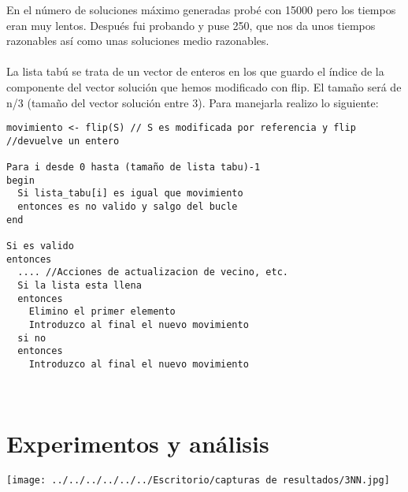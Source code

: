 En el número de soluciones máximo generadas probé con 15000 pero los tiempos eran muy lentos. Después fui probando y puse 250, que nos da unos tiempos razonables así como unas soluciones medio razonables.
\\
\\
La lista tabú se trata de un vector de enteros en los que guardo el índice de la componente del vector solución que hemos modificado con flip. El tamaño será de n/3 (tamaño del vector solución entre 3). Para manejarla realizo lo siguiente:
\begin{lstlisting}
movimiento <- flip(S) // S es modificada por referencia y flip 			//devuelve un entero

Para i desde 0 hasta (tamaño de lista tabu)-1
begin
  Si lista_tabu[i] es igual que movimiento
  entonces es no valido y salgo del bucle
end

Si es valido
entonces
  .... //Acciones de actualizacion de vecino, etc.
  Si la lista esta llena
  entonces
    Elimino el primer elemento
    Introduzco al final el nuevo movimiento
  si no
  entonces
    Introduzco al final el nuevo movimiento
  
 
\end{lstlisting}

\section{Experimentos y análisis}
\texttt{[image: ../../../../../../Escritorio/capturas de resultados/3NN.jpg]} 
